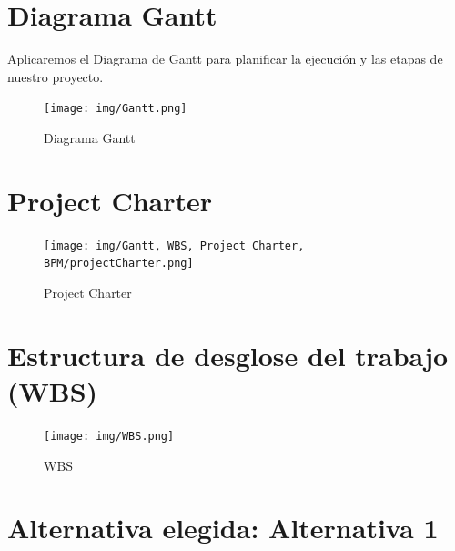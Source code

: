 \documentclass{article}
\begin{document}
\begin{doublespace}
\section{Diagrama Gantt}
    \noindent Aplicaremos el Diagrama de Gantt para planificar la ejecución y las etapas de nuestro proyecto.
    \begin{figure}[H]
        \centering
        \vspace*{1cm}
        \texttt{[image: img/Gantt.png]}
        \caption{Diagrama Gantt}
        \label{fig:Diagrama-gantt}
    \end{figure}

\section{Project Charter}

\begin{figure}[H]
    \centering
    \texttt{[image: img/Gantt, WBS, Project Charter, BPM/projectCharter.png]}
    \caption{Project Charter}
    \label{fig:Project-Charter}
\end{figure}


\section{Estructura de desglose del trabajo (WBS)}

    \begin{figure}[H]
        \centering
        \vspace*{1cm}
        \texttt{[image: img/WBS.png]}
        \caption{WBS}
        \label{fig:WBS}
    \end{figure}

\section{Alternativa elegida: Alternativa 1}


\end{doublespace}
\end{document}
